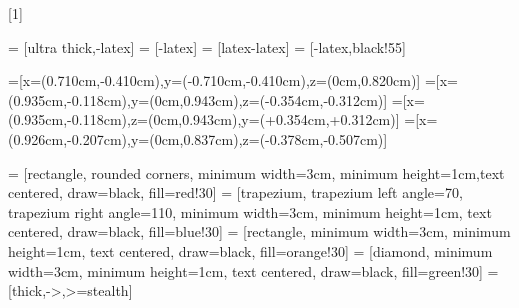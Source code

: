 \usepackage{pgfplots}
\usetikzlibrary{spy} %
\usetikzlibrary{shapes.misc}

\usetikzlibrary{patterns}
\usetikzlibrary{spy}
\usetikzlibrary{calc}
\usetikzlibrary{shapes.geometric, arrows}
\usetikzlibrary{matrix}
\usetikzlibrary{arrows,patterns}
\usepackage{environ}
\makeatletter
\newsavebox{\measure@tikzpicture}
[1]{%
    \def\tikz@width{#1}%
    \def\tikzscale{1}\begin{lrbox}{\measure@tikzpicture}%
        \BODY
    \end{lrbox}%
    \edef\tikzscale{\pgfmathresult}%
    \BODY
}
\makeatother
\pgfplotsset{
    colormap name=jet
}
\pgfplotsset{compat=newest}

\usepackage{tikz}

\usetikzlibrary{external}
\tikzexternalize[prefix=tikz/]


\newcommand{\tikzsetnextfilenamesafe}[1]{
    \StrSubstitute{#1}{/}{-}[\temp]
    \tikzsetnextfilename{\temp}
}
\usetikzlibrary{matrix}
\pgfplotsset{compat=newest}


   = [ultra thick,-latex]
 = [-latex]
    = [latex-latex]
   = [-latex,black!55]

=[x={(0.710cm,-0.410cm)},y={(-0.710cm,-0.410cm)},z={(0cm,0.820cm)}]
 =[x={(0.935cm,-0.118cm)},y={(0cm,0.943cm)},z={(-0.354cm,-0.312cm)}]
=[x={(0.935cm,-0.118cm)},z={(0cm,0.943cm)},y={(+0.354cm,+0.312cm)}]
=[x={(0.926cm,-0.207cm)},y={(0cm,0.837cm)},z={(-0.378cm,-0.507cm)}]

 = [rectangle, rounded corners, minimum width=3cm, minimum height=1cm,text centered, draw=black, fill=red!30]
 = [trapezium, trapezium left angle=70, trapezium right angle=110, minimum width=3cm, minimum height=1cm, text centered, draw=black, fill=blue!30]
 = [rectangle, minimum width=3cm, minimum height=1cm, text centered, draw=black, fill=orange!30]
 = [diamond, minimum width=3cm, minimum height=1cm, text centered, draw=black, fill=green!30]
 = [thick,->,>=stealth]
